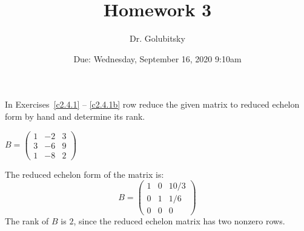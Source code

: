 \documentclass{article}
\title{Homework 3}
\author{Dr. Golubitsky}
\date{Due: Wednesday, September 16, 2020 \@9:10am}
\begin{document}
\maketitle


\problemlabel

\noindent In Exercises~\ref{c2.4.1} -- \ref{c2.4.1b} row reduce the given 
matrix to reduced echelon form by hand and determine its rank.


\begin{exercise} \label{c2.4.1b}
$B=\left(\begin{array}{rrr}
1 &  -2 & 3\\
3 &  -6 & 9 \\
1 &  -8 & 2
         \end{array}\right)$
  
\begin{solution}
\soln
The reduced echelon form of the matrix is:
\[
B=\left(\begin{array}{rrc} 1 & 0 & 10/3 \\ 
0 & 1 & 1/6 \\ 0 & 0 & 0 \end{array}\right)
\]
The rank of $B$ is $2$, since the reduced echelon matrix has two nonzero
rows.

\end{solution}
\end{exercise}





\problemlabel

\end{document}
